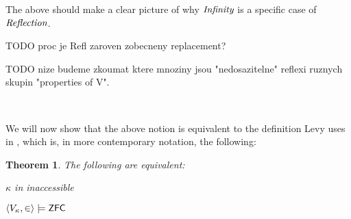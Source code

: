\documentclass[12pt,a4paper]{article}
\newtheorem{theorem}{Theorem}[section]
\newcommand{\bce}{\begin{compactenum}}
\newcommand{\ece}{\end{compactenum}}
\begin{document}
The above should make a clear picture of why $\emph{Infinity}$ is a specific case of $\emph{Reflection}$.

TODO proc je Refl zaroven zobecneny replacement?

TODO nize budeme zkoumat ktere mnoziny jsou "nedosazitelne" reflexi ruznych skupin "properties of V". 

\

We will now show that the above notion is equivalent to the definition Levy uses in \cite{Levy60a}, which is, in more contemporary notation, the following:
\begin{theorem}\label{theorem:inaccessible_models_zfc}
The following are equivalent:
\bce
\item $\kappa$ in inaccessible
\item $\langle V_\kappa, \in \rangle \models \sf{ZFC}$
\ece
\end{theorem}
\end{document}
